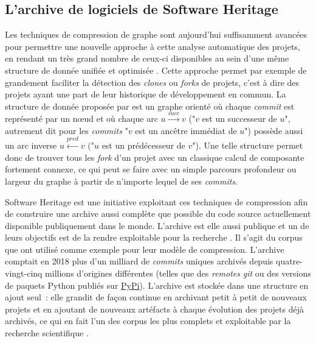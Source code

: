 \documentclass[dvipsnames]{llncs}
\newcommand{\en}[1]{\foreignlanguage{english}{\emph{#1}}}
\begin{document}
    \subsection{L'archive de logiciels de Software Heritage}

    \label{ssec:swh-graph}

    Les techniques de compression de graphe sont aujourd'hui suffisamment avancées pour permettre une nouvelle
    approche à cette analyse automatique des projets, en rendant un très grand nombre de ceux-ci disponibles
    au sein d'une même structure de donnée unifiée et optimisée \parencite{swh-graph-2020}. Cette approche
    permet par exemple de grandement faciliter la détection des \en{clones} ou \en{forks} de projets, c'est à
    dire des projets ayant une part de leur historique de développement en commun. La structure de donnée
    proposée par \textcite{swh-graph-2020} est un graphe orienté où chaque \en{commit} est représenté par un
    nœud et où chaque arc $u \xrightarrow{succ} v$ ("$v$ est un successeur de $u$", autrement dit pour les
    \en{commits} "$v$ est un ancêtre immédiat de $u$") possède aussi un arc inverse $u \xleftarrow{pred} v$
    ("$u$ est un prédécesseur de $v$"). Une telle structure permet donc de trouver tous les \en{fork} d'un
    projet avec un classique calcul de composante fortement connexe, ce qui peut se faire avec un simple
    parcours profondeur ou largeur du graphe à partir de n'importe lequel de ses \en{commits}.

    Software Heritage est une initiative exploitant ces techniques de compression afin de construire une
    archive aussi complète que possible du code source actuellement disponible publiquement dans le monde.
    L'archive est elle aussi publique et un de leurs objectifs est de la rendre exploitable pour la recherche
    \parencite{swh-2017}. Il s'agit du corpus que \textcite{swh-graph-2020} ont utilisé comme exemple pour
    leur modèle de compression. L'archive comptait en 2018 plus d'un milliard de \en{commits} uniques archivés
    depuis quatre-vingt-cinq millions d'origines différentes (telles que des \en{remotes} \en{git} ou des
    versions de paquets Python publiés sur \href{https://pypi.org/}{PyPi}). L'archive est stockée dans une
    structure en ajout seul : elle grandit de façon continue en archivant petit à petit de nouveaux projets
    et en ajoutant de nouveaux artéfacts à chaque évolution des projets déjà archivés, ce qui en fait l'un des
    corpus les plus complets et exploitable par la recherche scientifique
    \parencite{swh-2019,swh-growth-2019}.
\end{document}
